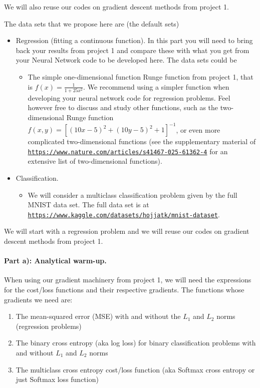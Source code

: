 \documentclass[%
oneside,                 %
final,                   %
10pt]{article}
\begin{document}
We will also reuse our codes on gradient descent methods from project 1.

The data sets that we propose here are (the default sets)

\begin{itemize}
\item Regression (fitting a continuous function). In this part you will need to bring back your results from project 1 and compare these with what you get from your Neural Network code to be developed here. The data sets could be
\begin{itemize}

  \item The simple one-dimensional function Runge function from project 1, that is $f(x) = \frac{1}{1+25x^2}$. We recommend using a simpler function when developing your neural network code for regression problems. Feel however free to discuss and study other functions, such as the two-dimensional Runge function $f(x,y)=\left[(10x - 5)^2 + (10y - 5)^2 + 1 \right]^{-1}$, or even more complicated two-dimensional functions (see the supplementary material of \href{{https://www.nature.com/articles/s41467-025-61362-4}}{\nolinkurl{https://www.nature.com/articles/s41467-025-61362-4}} for an extensive list of two-dimensional functions). 

\end{itemize}

\noindent
\item Classification.
\begin{itemize}

 \item We will consider a multiclass classification problem given by the full MNIST data set. The full data set is at \href{{https://www.kaggle.com/datasets/hojjatk/mnist-dataset}}{\nolinkurl{https://www.kaggle.com/datasets/hojjatk/mnist-dataset}}.
\end{itemize}

\noindent
\end{itemize}

\noindent
We will start with a regression problem and we will reuse our codes on gradient descent methods from project 1.

\paragraph{Part a): Analytical warm-up.}
When using our gradient machinery from project 1, we will need the expressions for the cost/loss functions and their respective
gradients. The functions whose gradients we need are:
\begin{enumerate}
\item The mean-squared error (MSE) with and without the $L_1$ and $L_2$ norms (regression problems)

\item The binary cross entropy (aka log loss)  for binary classification problems with and without $L_1$ and $L_2$ norms

\item The multiclass cross entropy cost/loss function (aka Softmax cross entropy or just Softmax loss function)
\end{enumerate}
\end{document}
